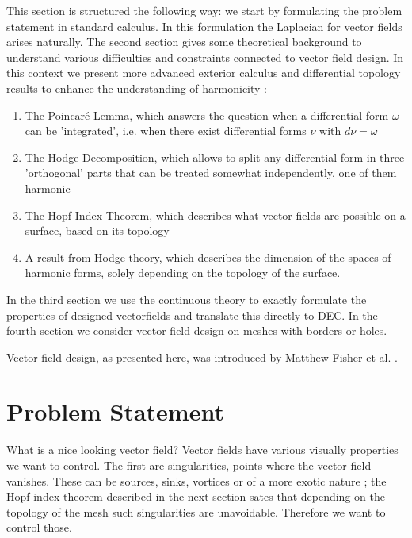 This section is structured the following way: we start by formulating the problem statement in standard calculus. In this formulation the Laplacian for vector fields arises naturally. The second section gives some theoretical background to understand various difficulties and constraints connected to vector field design. In this context we present more advanced exterior calculus and differential topology results to enhance the understanding of harmonicity :
\begin{enumerate}
\item The Poincar\'e Lemma, which answers the question when a differential form $\omega$ can be 'integrated', i.e. when there exist differential forms $\nu$ with $d\nu = \omega$
\item The Hodge Decomposition, which allows to split any differential form in three 'orthogonal' parts that can be treated somewhat independently, one of them harmonic
\item The Hopf Index Theorem, which describes what vector fields are possible on a surface, based on its topology
\item A result from Hodge theory, which describes the dimension of the spaces of harmonic forms, solely depending on the topology of the surface.
\end{enumerate}
In the third section we use the continuous theory to  exactly formulate the properties of designed vectorfields and translate this directly to DEC. In the fourth section we consider vector field design on meshes with borders or holes. 

Vector field design, as presented here, was introduced by Matthew Fisher et al. .

\section{Problem Statement}
What is a nice looking vector field? Vector fields have various visually properties we want to control. The first are singularities, points where the vector field vanishes. These can be sources, sinks, vortices or of a more exotic nature ; the Hopf index theorem described in the next section sates that depending on the topology of the mesh such singularities are unavoidable. Therefore we want to control those.

